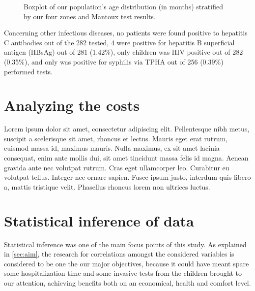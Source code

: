 \begin{figure}[H]
\caption{Boxplot of our population's age distribution (in months) stratified by our four zones and Mantoux test results.}
\label{fig:boxplot_Mantoux}
\end{figure}

Concerning other infectious diseases, no patients were found positive to hepatitis C antibodies out of the 282 tested, 4 were positive for hepatitis B superficial antigen (HBsAg) out of 281 (1.42\%), only children was HIV positive out of 282 (0.35\%), and only was positive for syphilis via TPHA out of 256 (0.39\%) performed tests.

\section{Analyzing the costs}\label{sec:analyzingcosts}
Lorem ipsum dolor sit amet, consectetur adipiscing elit. Pellentesque nibh metus, suscipit a scelerisque sit amet, rhoncus et lectus. Mauris eget erat rutrum, euismod massa id, maximus mauris. Nulla maximus, ex sit amet lacinia consequat, enim ante mollis dui, sit amet tincidunt massa felis id magna. Aenean gravida ante nec volutpat rutrum. Cras eget ullamcorper leo. Curabitur eu volutpat tellus. Integer nec ornare sapien. Fusce ipsum justo, interdum quis libero a, mattis tristique velit. Phasellus rhoncus lorem non ultrices luctus.


\section{Statistical inference of data}\label{sec:statisticalinference}
Statistical inference was one of the main focus points of this study. As explained in \ref{sec:aim}, the research for correlations amongst the considered variables is considered to be one the our major objectives, because it could have meant spare some hospitalization time and some invasive tests from the children brought to our attention, achieving benefits both on an economical, health and comfort level.

